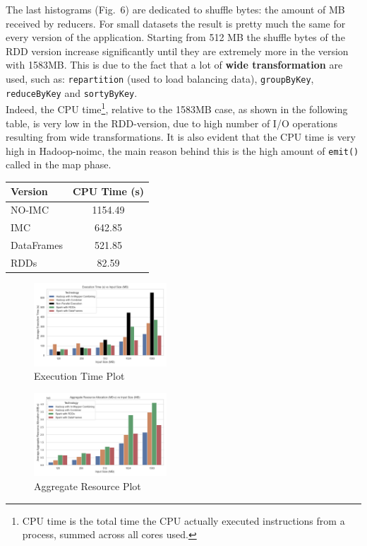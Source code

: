 The last histograms (Fig.~6) are dedicated to shuffle bytes: the amount of MB received by reducers. For small datasets the result is pretty much the same for every version of the application. Starting from 512 MB the shuffle bytes of the RDD version increase significantly until they are extremely more in the version with 1583MB. This is due to the fact that a lot of \textbf{wide transformation} are used, such as: \texttt{repartition} (used to load balancing data), \texttt{groupByKey}, \texttt{reduceByKey} and \texttt{sortyByKey}.\\
Indeed, the CPU time\footnote{CPU time is the total time the CPU actually executed instructions from a process, summed across all cores used.}, relative to the 1583MB case, as shown in the following table, is very low in the RDD-version, due to high number of I/O operations resulting from wide transformations. It is also evident that the CPU time is very high in Hadoop-noimc, the main reason behind this is the high amount of \texttt{emit()} called in the map phase.
\begin{table}[H]
	\centering
	\begin{tabular}{lc}
		\hline
		\textbf{Version} & \textbf{CPU Time (s)} \\
		\hline
		NO-IMC    & 1154.49 \\
		IMC  & 642.85 \\
		DataFrames & 521.85 \\
		RDDs       & 82.59 \\
		\hline
	\end{tabular}
	\label{tab:avg-cpu-time}
\end{table}
\begin{figure}[H]
	\centering
	\includegraphics[width=0.444\textwidth]{images/Fig_Execution_Time.png}
	\caption{Execution Time Plot}
	\label{fig:execution-time}
\end{figure}
\begin{figure}[H]
	\centering
	\includegraphics[width=0.444\textwidth]{images/Fig_Aggregate_Resource_Allocation.png}
	\caption{Aggregate Resource Plot}
	\label{fig:aggregate-resource-allocation}
\end{figure}
